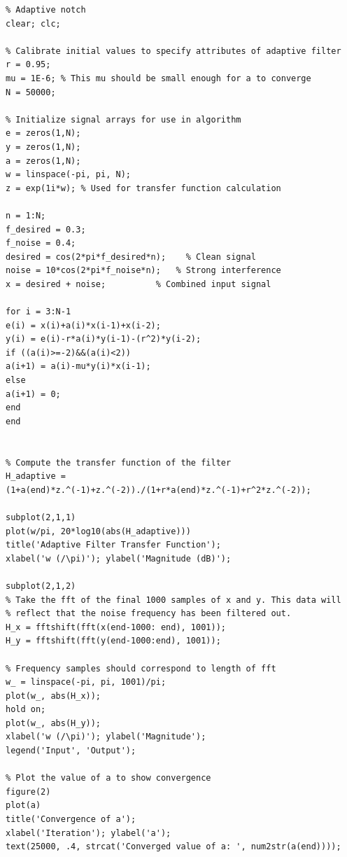 \documentclass[12pt, letterpaper]{article}
\begin{document}
	\begin{lstlisting}
% Adaptive notch
clear; clc;

% Calibrate initial values to specify attributes of adaptive filter 
r = 0.95;
mu = 1E-6; % This mu should be small enough for a to converge
N = 50000; 

% Initialize signal arrays for use in algorithm
e = zeros(1,N);
y = zeros(1,N);
a = zeros(1,N);
w = linspace(-pi, pi, N);
z = exp(1i*w); % Used for transfer function calculation

n = 1:N;
f_desired = 0.3;
f_noise = 0.4;
desired = cos(2*pi*f_desired*n);    % Clean signal 
noise = 10*cos(2*pi*f_noise*n);   % Strong interference 
x = desired + noise;          % Combined input signal

for i = 3:N-1
e(i) = x(i)+a(i)*x(i-1)+x(i-2);
y(i) = e(i)-r*a(i)*y(i-1)-(r^2)*y(i-2);
if ((a(i)>=-2)&&(a(i)<2)) 
a(i+1) = a(i)-mu*y(i)*x(i-1);
else 
a(i+1) = 0;
end 
end


% Compute the transfer function of the filter
H_adaptive = (1+a(end)*z.^(-1)+z.^(-2))./(1+r*a(end)*z.^(-1)+r^2*z.^(-2));

subplot(2,1,1)
plot(w/pi, 20*log10(abs(H_adaptive)))
title('Adaptive Filter Transfer Function');
xlabel('w (/\pi)'); ylabel('Magnitude (dB)');

subplot(2,1,2)
% Take the fft of the final 1000 samples of x and y. This data will
% reflect that the noise frequency has been filtered out.
H_x = fftshift(fft(x(end-1000: end), 1001));
H_y = fftshift(fft(y(end-1000:end), 1001));

% Frequency samples should correspond to length of fft
w_ = linspace(-pi, pi, 1001)/pi;  
plot(w_, abs(H_x));
hold on;
plot(w_, abs(H_y));
xlabel('w (/\pi)'); ylabel('Magnitude');
legend('Input', 'Output');

% Plot the value of a to show convergence
figure(2)
plot(a)
title('Convergence of a');
xlabel('Iteration'); ylabel('a');
text(25000, .4, strcat('Converged value of a: ', num2str(a(end))));
	\end{lstlisting}
	
\end{document}
